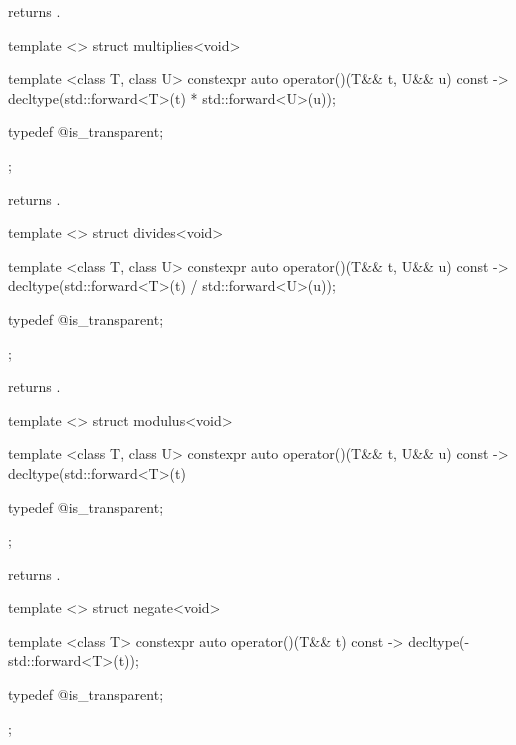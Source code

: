\begin{itemdescr}
\pnum
{} returns .
\end{itemdescr}

%
\begin{itemdecl}
template <> struct multiplies<void> {
  template <class T, class U> constexpr auto operator()(T&& t, U&& u) const
    -> decltype(std::forward<T>(t) * std::forward<U>(u));

  typedef @\unspec@ is_transparent;
};
\end{itemdecl}

\begin{itemdescr}
\pnum
{} returns .
\end{itemdescr}

%
\begin{itemdecl}
template <> struct divides<void> {
  template <class T, class U> constexpr auto operator()(T&& t, U&& u) const
    -> decltype(std::forward<T>(t) / std::forward<U>(u));

  typedef @\unspec@ is_transparent;
};
\end{itemdecl}

\begin{itemdescr}
\pnum
{} returns .
\end{itemdescr}

%
\begin{itemdecl}
template <> struct modulus<void> {
  template <class T, class U> constexpr auto operator()(T&& t, U&& u) const
    -> decltype(std::forward<T>(t) %

  typedef @\unspec@ is_transparent;
};
\end{itemdecl}

\begin{itemdescr}
\pnum
{} returns .
\end{itemdescr}

%
\begin{itemdecl}
template <> struct negate<void> {
  template <class T> constexpr auto operator()(T&& t) const
    -> decltype(-std::forward<T>(t));

  typedef @\unspec@ is_transparent;
};
\end{itemdecl}

